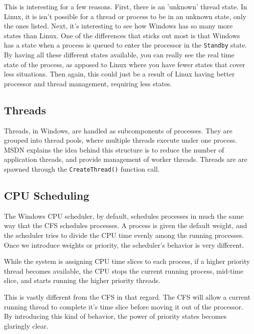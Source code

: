 \documentclass[10pt,letterpaper,onecolumn,draftclsnofoot]{IEEEtran}
\begin{document}
This is interesting for a few reasons. First, there is an 'unknown' thread state.
In Linux, it is isn't possible for a thread or process to be in an unknown state,
only the ones listed. Next, it's interesting to see how Windows has so many more
states than Linux. One of the differences that sticks out most is that Windows
has a state when a process is queued to enter the processor in the \texttt{Standby}
state.
By having all these different states available, you can really see the real time
state of the process, as apposed to Linux where you have fewer states that cover
less situations. Then again, this could just be a result of Linux having better
processor and thread management, requiring less states.


  \subsection{Threads}
Threads, in Windows, are handled as subcomponents of processes. They are grouped
into thread pools, where multiple threads execute under one process. MSDN explains
the idea behind this structure is to reduce the number of application threads, and
provide management of worker threads. Threads are are spawned through the
\texttt{CreateThread()} function call.\cite{msthreadcreate2016}

%

  \subsection{CPU Scheduling}
  The Windows CPU scheduler, by default, schedules processes in much the same way
  that the CFS schedules processes. A process is given the default weight, and
  the scheduler tries to divide the CPU time evenly among the running processes.
  Once we introduce weights or priority, the scheduler's behavior is very different.

  While the system is assigning CPU time slices to each process, if a higher priority
  thread becomes available, the CPU stops the current running process, mid-time
  slice, and starts running the higher priority threads.

  This is vastly different from the CFS in that regard. The CFS will allow a current
  running thread to complete it's time slice before moving it out of the processor.
  By introducing this kind of behavior, the power of priority states becomes glaringly
  clear.
\end{document}
